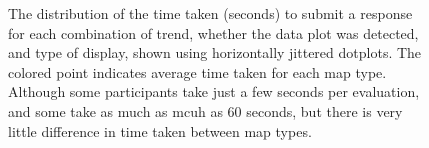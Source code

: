 \documentclass[
doublespace,
  times]{anzsauth}
\begin{document}
\begin{figure}


\caption{\label{fig-beeswarm}The distribution of the time taken
(seconds) to submit a response for each combination of trend, whether
the data plot was detected, and type of display, shown using
horizontally jittered dotplots. The colored point indicates average time
taken for each map type. Although some participants take just a few
seconds per evaluation, and some take as much as mcuh as 60 seconds, but
there is very little difference in time taken between map types.}

\end{figure}%
\end{document}
